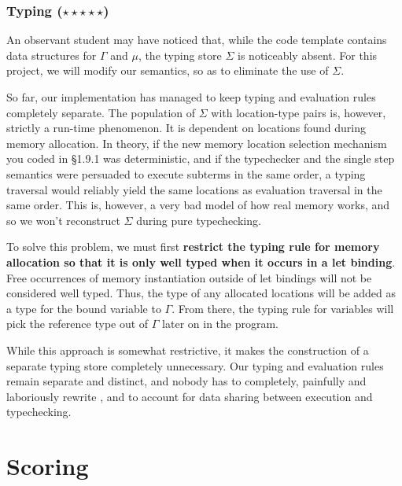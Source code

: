 \documentclass{exam}
\let\OldTexttt\texttt
\renewcommand{\texttt}[1]{\OldTexttt{\color{teal}{#1}}}
\begin{document}
\subsubsection{Typing ($\star\star\star\star\star$)}

An observant student may have noticed that, while the code template contains data structures for $\Gamma$ and $\mu$, the typing store $\Sigma$ is noticeably absent.  For this project, we will modify our semantics, so as to eliminate the use of $\Sigma$.

So far, our implementation has managed to keep typing and evaluation rules completely separate.  The population of $\Sigma$ with location-type pairs is, however, strictly a run-time phenomenon.  It is dependent on locations found during memory allocation.  In theory, if the new memory location selection mechanism you coded in \S 1.9.1 was deterministic, and if the typechecker and the single step semantics were persuaded to execute subterms in the same order, a typing traversal would reliably yield the same locations as evaluation traversal in the same order.  This is, however, a very bad model of how real memory works, and so we won't reconstruct $\Sigma$ during pure typechecking.

To solve this problem, we must first \textbf{restrict the typing rule for memory allocation so that it is only well typed when it occurs in a let binding}.  Free occurrences of memory instantiation outside of let bindings will not be considered well typed.  Thus, the type of any allocated locations will be added as a type for the bound variable to $\Gamma$.  From there, the typing rule for variables will pick the reference type out of $\Gamma$ later on in the program.  

While this approach is somewhat restrictive, it makes the construction of a separate typing store completely unnecessary.  Our typing and evaluation rules remain separate and distinct, and nobody has to completely, painfully and laboriously rewrite \texttt{eval}, \texttt{typeCheck} and \texttt{ssos} to account for data sharing between execution and typechecking.  



\section{Scoring}
\end{document}
